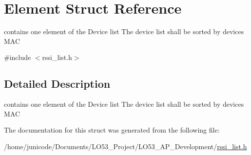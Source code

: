 \hypertarget{struct_element}{}\section{Element Struct Reference}
\label{struct_element}


contains one element of the Device list The device list shall be sorted by device\textquotesingle{}s M\+A\+C  




{\ttfamily \#include $<$rssi\+\_\+list.\+h$>$}



\subsection{Detailed Description}
contains one element of the Device list The device list shall be sorted by device\textquotesingle{}s M\+A\+C 

The documentation for this struct was generated from the following file\+:\begin{DoxyCompactItemize}
\item 
/home/junicode/\+Documents/\+L\+O53\+\_\+\+Project/\+L\+O53\+\_\+\+A\+P\+\_\+\+Development/\hyperlink{rssi__list_8h}{rssi\+\_\+list.\+h}\end{DoxyCompactItemize}
